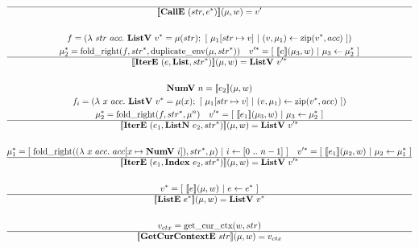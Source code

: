 \begin{gather*}
  \hline
  \sem{\calle ~ (str, \seq{e})}(\mu, w) = v' \\
%
\newline \\
  f =
    (\lambda ~ str ~ acc. ~
      \listv ~ \seq v = \mu(str); ~
      [ ~ \mu_1[str \mapsto v] ~ | ~ (v, \mu_1) \leftarrow \zip (\seq v, acc) ~ ]
    )
  \\
  \seq{\mu_2} = \fold(f, \seq{str}, \duplicateenv(\mu, \seq{str})) \quad
  \seq{v'} = [ ~ \sem{e}(\mu_3, w) ~ | ~ \mu_3 \leftarrow \seq {\mu_2} ~ ] \\
  \hline
  \sem{\itere ~ (e, \listiter, \seq{str})}(\mu, w) = \listv ~ \seq{v'} \\
%
\newline \\
  \numv ~ n = \sem{e_2}(\mu, w) \\
  f_i =
    (\lambda ~ x ~ acc. ~
      \listv ~ \seq v = \mu(x); ~
      [ ~ \mu_1[str \mapsto v] ~ | ~ (v, \mu_1) \leftarrow \zip (\seq v, acc) ~ ]
    )
  \\
  \seq{\mu_2} = \fold(f, \seq{str}, \mu^n) \quad
  \seq{v'} = [ ~ \sem{e_1}(\mu_3, w) ~ | ~ \mu_3 \leftarrow \seq {\mu_2} ~ ] \\
  \hline
  \sem{\itere ~ (e_1, \listniter ~ e_2, \seq{str})}(\mu, w) = \listv ~ \seq{v'} \\
%
\newline \\
  \seq{\mu_1} =
    [ ~
      \fold(
        (\lambda ~ x ~ acc. ~ acc[x \mapsto \numv ~ i]),
        \seq{str},
        \mu
      )
    ~ | ~
      i \leftarrow [0 ~ .. ~ n-1]
    ~ ]
  \quad
  \seq{v'} = [ ~ \sem{e_1}(\mu_2, w) ~ | ~ \mu_2 \leftarrow \seq {\mu_1} ~ ] \\
  \hline
  \sem{\itere ~ (e_1, \listidxiter ~ e_2, \seq{str})}(\mu, w) = \listv ~ \seq{v'} \\
%
\newline \\
  \seq{v} = [ ~ \sem{e}(\mu, w) ~ | ~ e \leftarrow \seq e ~ ] \\
  \hline
  \sem{\liste ~ \seq{e}}(\mu, w) = \listv ~ \seq{v} \\
%
\newline \\
  v_{ctx} = \getcurctx(w, str) \\
  \hline
  \sem{\getcurctxe ~ str}(\mu, w) = v_{ctx} \\
%
\newline \\

\end{gather*}
